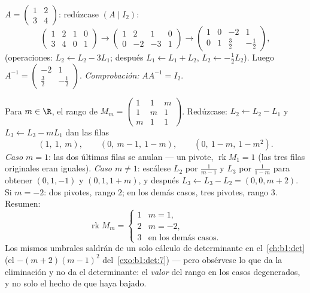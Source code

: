 \begin{example}\label{ex:b1:matrices:inverse}
$A = \begin{pmatrix} 1 & 2 \\ 3 & 4 \end{pmatrix}$: redúzcase
$(A \mid I_2)$:
\[
\begin{pmatrix} 1 & 2 & 1 & 0\\ 3 & 4 & 0 & 1 \end{pmatrix}
\to
\begin{pmatrix} 1 & 2 & 1 & 0\\ 0 & -2 & -3 & 1 \end{pmatrix}
\to
\begin{pmatrix} 1 & 0 & -2 & 1\\ 0 & 1 & \tfrac32 & -\tfrac12
\end{pmatrix},
\]
(operaciones: $L_2 \leftarrow L_2 - 3L_1$; después
$L_1 \leftarrow L_1 + L_2$, $L_2 \leftarrow -\frac12 L_2$). Luego
$A^{-1} = \begin{pmatrix} -2 & 1 \\ \tfrac32 &
-\tfrac12\end{pmatrix}$. \emph{Comprobación:} $AA^{-1} = I_2$.
\end{example}

\begin{example}
\label{ex:b1:matrices:rankparameter}
Para $m \in \R$, el rango de
$M_m = \begin{pmatrix} 1 & 1 & m\\ 1 & m & 1\\ m & 1 &
1\end{pmatrix}$. Redúzcase: $L_2 \leftarrow L_2 - L_1$ y
$L_3 \leftarrow L_3 - mL_1$ dan las filas
\[
(1,\ 1,\ m), \qquad (0,\ m - 1,\ 1 - m), \qquad
(0,\ 1 - m,\ 1 - m^2).
\]
\emph{Caso $m = 1$}: las dos últimas filas se anulan --- un pivote,
$\operatorname{rk} M_1 = 1$ (las tres filas originales eran iguales).
\emph{Caso $m \neq 1$}: escálese $L_2$ por $\frac1{m-1}$ y $L_3$ por
$\frac1{1-m}$ para obtener $(0, 1, -1)$ y $(0, 1, 1 + m)$, y después
$L_3 \leftarrow L_3 - L_2 = (0, 0, m + 2)$. Si $m = -2$: dos pivotes,
rango $2$; en los demás casos, tres pivotes, rango $3$. Resumen:
\[
\operatorname{rk} M_m =
\begin{cases}
1 & m = 1,\\
2 & m = -2,\\
3 & \text{en los demás casos}.
\end{cases}
\]
Los mismos umbrales saldrán de un solo cálculo de determinante en
el~\cref{ch:b1:det} (el  $-(m+2)(m-1)^2$
del~\cref{exo:b1:det:7}) --- pero obsérvese lo que da la eliminación
y no da el determinante: el \emph{valor} del rango en los casos
degenerados, y no solo el hecho de que haya bajado.
\end{example}

